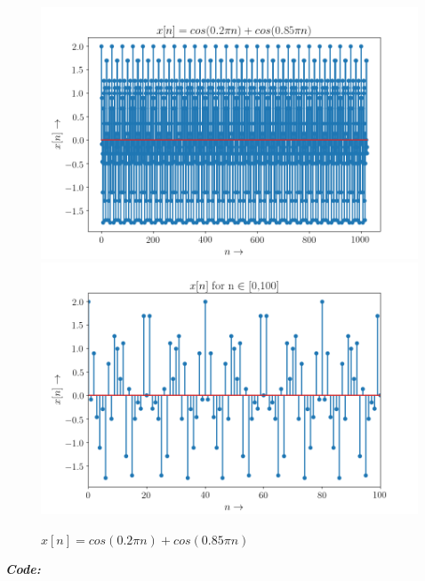 \documentclass[11pt, a4paper]{article}
\begin{document}
\begin{figure}[!tbh]
  \centering
  \includegraphics[scale=0.6]{./../Extras/a10-3.png}  %
  \includegraphics[scale=0.6]{./../Extras/a10-4.png}  %
  \caption{$x[n] = cos(0.2\pi n)+cos(0.85\pi n) $}
\end{figure}
\newpage
\textit{\textbf{Code:}}
\end{document}
